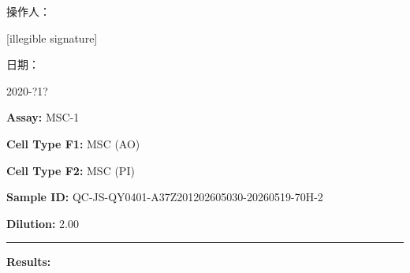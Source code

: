 \documentclass[UTF8,10pt,a4paper,fontset=fandol]{ctexart}
\newcommand{\fieldvalue}[1]{#1}
\newcommand{\handwritten}[1]{#1}
\begin{document}
\bigskip

\noindent

\hfill

\medskip

\noindent

\hfill

\vfill

\noindent 操作人：

\fieldvalue{\handwritten{[illegible signature]}}

\hfill 日期：

\fieldvalue{\handwritten{2020-?1?}}

\newpage

\noindent\textbf{Assay:} 
\fieldvalue{MSC-1}

\medskip
\noindent\textbf{Cell Type F1:} 
\fieldvalue{MSC (AO)}

\noindent\textbf{Cell Type F2:} 
\fieldvalue{MSC (PI)}

\medskip
\noindent\textbf{Sample ID:} 
\fieldvalue{QC-JS-QY0401-A37Z201202605030-20260519-70H-2}

\noindent\textbf{Dilution:} 
\fieldvalue{2.00}

\medskip
\noindent\rule{\linewidth}{0.4pt}

\noindent\textbf{Results:}
\end{document}

